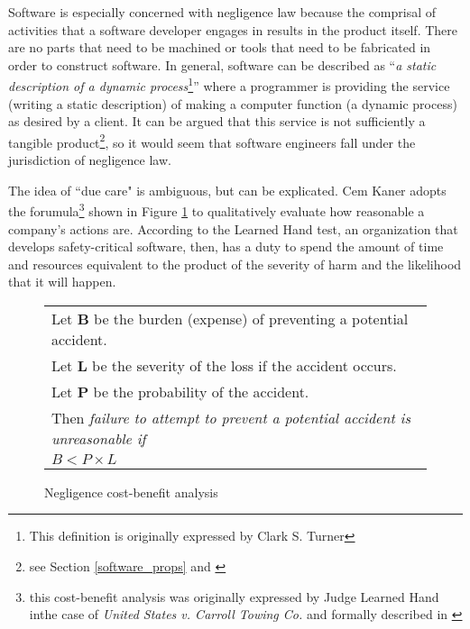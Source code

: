 Software is especially concerned with negligence law because the comprisal of
activities that a software developer engages in results in the product itself.
There are no parts that need to be machined or tools that need to be fabricated
in order to construct software. In general, software can be described as 
``\textit{a static description of a dynamic process}\footnote{This definition
is originally expressed by Clark S. Turner}'' where a programmer is providing
the service (writing a static description) of making a computer function (a
dynamic process) as desired by a client. It can be argued that this service is
not sufficiently a tangible product\footnote{see Section \ref{software_props}
and \cite{Turner2000}}, so it would seem that software engineers fall under the
jurisdiction of negligence law.

The idea of ``due care" is ambiguous, but can be explicated. Cem Kaner adopts
the forumula\footnote{this cost-benefit analysis was originally expressed by
Judge Learned Hand inthe case of  \textit{United States v. Carroll Towing Co.}
and formally described in \cite{Kaner_neg_1995}} shown in Figure 
\ref{fig:negligence} to qualitatively evaluate how reasonable a company's
actions are. According to the Learned Hand test, an organization that develops 
safety-critical software, then, has a duty to spend the amount of time and
resources equivalent to the product of the severity of harm and the likelihood
that it will happen.

\begin{figure}
\begin{narrow}{-1.5in}{-1.5in}\begin{center}
\begin{tabular}{|l|}
\hline
	Let \textbf{B} be the burden (expense) of preventing a potential accident.\\
	Let \textbf{L} be the severity of the loss if the accident occurs.\\
	Let \textbf{P} be the probability of the accident.\\[6pt]
	Then \textit{failure to attempt to prevent a potential accident is 
	unreasonable if}\\[8pt]

      \centerline{\(B < P \times L\)}
\\[3pt]
\hline
\end{tabular}
\end{center}\end{narrow}
\caption{Negligence cost-benefit analysis}
\label{fig:negligence}
\end{figure}

